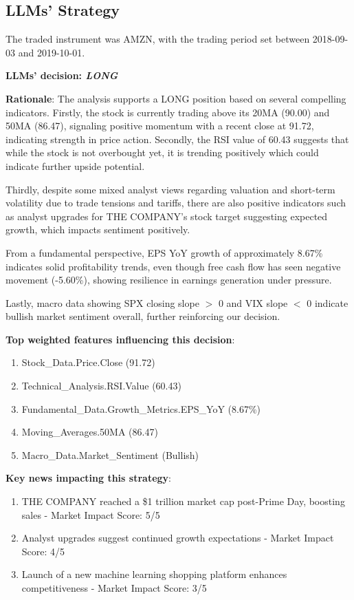 \documentclass[8pt]{scrartcl}
\begin{document}
\newpage

\subsection*{LLMs' Strategy} \label{strategy5}

The traded instrument was AMZN, with the trading period set between 2018-09-03 and 2019-10-01.

\textbf{LLMs' decision: \textit{LONG}}

\textbf{Rationale}: The analysis supports a LONG position based on several compelling indicators. Firstly, the stock is currently trading above its 20MA (90.00) and 50MA (86.47), signaling positive momentum with a recent close at 91.72, indicating strength in price action. Secondly, the RSI value of 60.43 suggests that while the stock is not overbought yet, it is trending positively which could indicate further upside potential.

Thirdly, despite some mixed analyst views regarding valuation and short-term volatility due to trade tensions and tariffs, there are also positive indicators such as analyst upgrades for THE COMPANY’s stock target suggesting expected growth, which impacts sentiment positively.

From a fundamental perspective, EPS YoY growth of approximately 8.67\% indicates solid profitability trends, even though free cash flow has seen negative movement (-5.60\%), showing resilience in earnings generation under pressure.

Lastly, macro data showing SPX closing slope $>$ 0 and VIX slope $<$ 0 indicate bullish market sentiment overall, further reinforcing our decision.

\textbf{Top weighted features influencing this decision}:
\begin{enumerate}
    \item Stock\_Data.Price.Close (91.72)
    \item Technical\_Analysis.RSI.Value (60.43)
    \item Fundamental\_Data.Growth\_Metrics.EPS\_YoY (8.67\%)
    \item Moving_Averages.50MA (86.47)
    \item Macro\_Data.Market_Sentiment (Bullish)
\end{enumerate}

\textbf{Key news impacting this strategy}:
\begin{enumerate}
    \item THE COMPANY reached a \$1 trillion market cap post-Prime Day, boosting sales - Market Impact Score: 5/5
    \item Analyst upgrades suggest continued growth expectations - Market Impact Score: 4/5
    \item Launch of a new machine learning shopping platform enhances competitiveness - Market Impact Score: 3/5
\end{enumerate}
\end{document}
